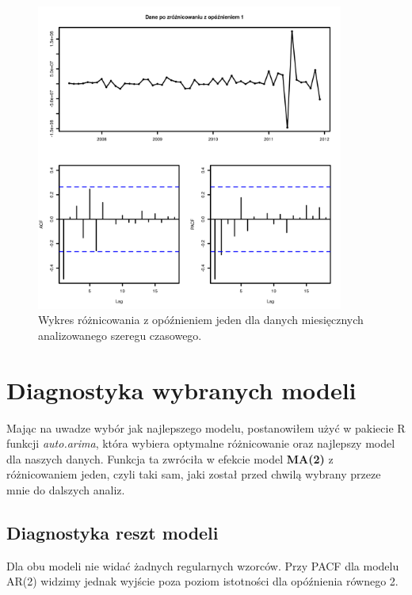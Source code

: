 \documentclass[11pt]{article}
\begin{document}
\begin{figure}[h]
    \centering
	\includegraphics[width=0.9\textwidth]{images/data_monthly_train_roznicowanie_z_opoznieniem_jeden.png}
    \caption{Wykres różnicowania z opóźnieniem jeden dla danych miesięcznych analizowanego szeregu czasowego.}
    \label{fig:data_monthly_train_roznicowanie_z_opoznieniem_jeden}

\end{figure}

\newpage

\section{Diagnostyka wybranych modeli}

Mając na uwadze wybór jak najlepszego modelu, postanowiłem użyć w pakiecie R funkcji \textit{auto.arima}, która wybiera optymalne różnicowanie oraz najlepszy model dla naszych danych. Funkcja ta zwróciła w efekcie model \textbf{MA(2)} z różnicowaniem jeden, czyli taki sam, jaki został przed chwilą wybrany przeze mnie do dalszych analiz.

\subsection{Diagnostyka reszt modeli}

Dla obu modeli nie widać żadnych regularnych wzorców. Przy PACF dla modelu AR(2) widzimy jednak wyjście poza poziom istotności dla opóźnienia równego 2. 
\end{document}
